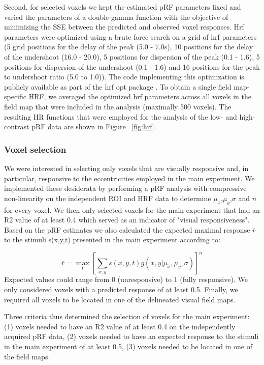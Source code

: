 Second, for selected voxels we kept the estimated pRF parameters fixed and varied the parameters of a double-gamma function with the objective of minimizing the SSE between the predicted and observed voxel responses. Hrf parameters were optimized using a brute force search on a grid of hrf parameters (5 grid positions for the delay of the peak (5.0 - 7.0s), 10 positions for the delay of the undershoot (16.0 - 20.0), 5 positions for dispersion of the peak (0.1 - 1.6), 5 positions for dispersion of the undershoot (0.1 - 1.6) and 16 positions for the peak to undershoot ratio (5.0 to 1.0)). The code implementing this optimization is publicly available as part of the hrf opt package \parencite{hrf_opt}. To obtain a single field map-specific HRF, we averaged the optimized hrf parameters across all voxels in the field map that were included in the analysis (maximally 500 voxels). The resulting HR functions that were employed for the analysis of the low- and high-contrast pRF data are shown in Figure ~\ref{fig:hrf}.

\subsubsection{Voxel selection}
We were interested in selecting only voxels that are visually responsive and, in particular, responsive to the eccentricities employed in the main experiment. We implemented these desiderata by performing a pRF analysis with compressive non-linearity on the independent ROI and HRF data to determine $\mu_x$,$\mu_y$,$\sigma$ and $n$ for every voxel. We then only selected voxels for the main experiment that had an R2 value of at least 0.4 which served as an indicator of "visual responsiveness". Based on the pRF estimates we also calculated the expected maximal response $\overline{r}$ to the stimuli s(x,y,t) presented in the main experiment according to:

\begin{equation}
\overline{r} = \max_t [\sum_{x,y} s(x,y,t) g(x, y|\mu_x,\mu_y,\sigma)]^n
\end{equation}
Expected values could range from 0 (unresponsive) to 1 (fully responsive). We only considered voxels with a predicted response of at least 0.5. Finally, we required all voxels to be located in one of the delineated visual field maps.

Three criteria thus determined the selection of voxels for the main experiment: (1) voxels needed to have an R2 value of at least 0.4 on the independently acquired pRF data, (2) voxels needed to have an expected response to the stimuli in the main experiment of at least 0.5, (3) voxels needed to be located in one of the field maps.

